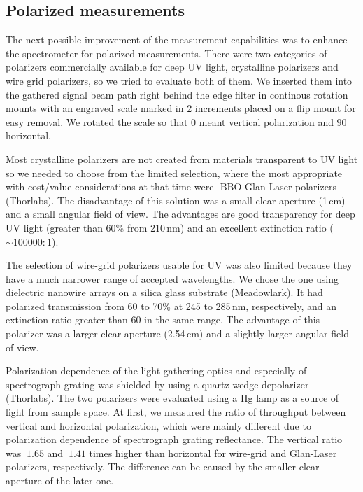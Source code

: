 \subsection{Polarized measurements}

The next possible improvement of the measurement capabilities was to enhance
the spectrometer for polarized measurements.
There were two categories of polarizers commercially available for deep UV
light, crystalline polarizers and wire grid polarizers, so we tried to evaluate
both of them.
We inserted them into the gathered signal beam path right behind the edge
filter in continous rotation mounts with an engraved scale marked in
2\textdegree{} increments placed on a flip mount for easy removal.
We rotated the scale so that 0\textdegree{} meant vertical polarization and
90\textdegree{} horizontal.

Most crystalline polarizers are not created from materials transparent to UV
light so we needed to choose from the limited selection, where the most
appropriate with cost/value considerations at that time were -BBO
Glan-Laser polarizers (Thorlabs).
The disadvantage of this solution was a small clear aperture (1\,cm) and a
small angular field of view.
The advantages are good transparency for deep UV light (greater than 60\% from
210\,nm) and an excellent extinction ratio ($\sim 100000:1$).

The selection of wire-grid polarizers usable for UV was also limited because
they have a much narrower range of accepted wavelengths.
We chose the one using dielectric nanowire arrays on a silica glass substrate
(Meadowlark).
It had polarized transmission from 60 to 70\% at 245 to 285\,nm, respectively,
and an extinction ratio greater than 60 in the same range.
The advantage of this polarizer was a larger clear aperture (2.54\,cm) and a
slightly larger angular field of view.

Polarization dependence of the light-gathering optics and especially of
spectrograph grating was shielded by using a quartz-wedge depolarizer
(Thorlabs).
The two polarizers were evaluated using a Hg lamp as a source of light from
sample space.
At first, we measured the ratio of throughput between vertical and horizontal
polarization, which were mainly different due to polarization dependence of
spectrograph grating reflectance.
The vertical ratio was $~1.65$ and $~1.41$ times higher than horizontal for
wire-grid and Glan-Laser polarizers, respectively.
The difference can be caused by the smaller clear aperture of the later one.

